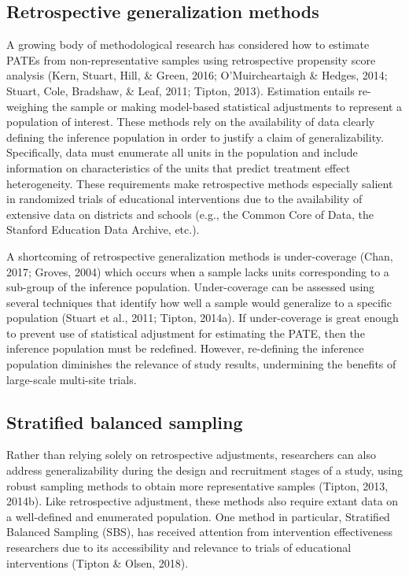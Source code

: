 \documentclass[
  english,
  man,floatsintext]{apa6}
\begin{document}
\hypertarget{retrospective-generalization-methods}{%
\subsection*{Retrospective generalization methods}\label{retrospective-generalization-methods}}

A growing body of methodological research has considered how to estimate PATEs from non-representative samples using retrospective propensity score analysis (Kern, Stuart, Hill, \& Green, 2016; O'Muircheartaigh \& Hedges, 2014; Stuart, Cole, Bradshaw, \& Leaf, 2011; Tipton, 2013). Estimation entails re-weighing the sample or making model-based statistical adjustments to represent a population of interest.
These methods rely on the availability of data clearly defining the inference population in order to justify a claim of generalizability. Specifically, data must enumerate all units in the population and include information on characteristics of the units that predict treatment effect heterogeneity. These requirements make retrospective methods especially salient in randomized trials of educational interventions due to the availability of extensive data on districts and schools (e.g., the Common Core of Data, the Stanford Education Data Archive, etc.).

A shortcoming of retrospective generalization methods is under-coverage (Chan, 2017; Groves, 2004) which occurs when a sample lacks units corresponding to a sub-group of the inference population. Under-coverage can be assessed using several techniques that identify how well a sample would generalize to a specific population (Stuart et al., 2011; Tipton, 2014a). If under-coverage is great enough to prevent use of statistical adjustment for estimating the PATE, then the inference population must be redefined. However, re-defining the inference population diminishes the relevance of study results, undermining the benefits of large-scale multi-site trials.

\hypertarget{stratified-balanced-sampling}{%
\subsection*{Stratified balanced sampling}\label{stratified-balanced-sampling}}

Rather than relying solely on retrospective adjustments, researchers can also address generalizability during the design and recruitment stages of a study, using robust sampling methods to obtain more representative samples (Tipton, 2013, 2014b). Like retrospective adjustment, these methods also require extant data on a well-defined and enumerated population.
One method in particular, Stratified Balanced Sampling (SBS), has received attention from intervention effectiveness researchers due to its accessibility and relevance to trials of educational interventions (Tipton \& Olsen, 2018).
\end{document}

